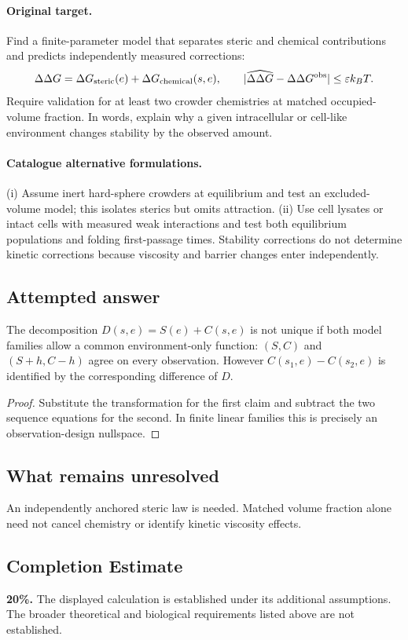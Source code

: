 \documentclass[11pt]{article}
\begin{document}
\paragraph{Original target.}
Find a finite-parameter model that separates steric and chemical contributions and predicts independently measured corrections:
\[
\Delta\Delta G=\Delta G_{\rm steric}(e)+\Delta G_{\rm chemical}(s,e),\qquad
|\widehat{\Delta\Delta G}-\Delta\Delta G^{\rm obs}|\leq\varepsilon k_BT.
\]
Require validation for at least two crowder chemistries at matched occupied-volume fraction. In words, explain why a given intracellular or cell-like environment changes stability by the observed amount.
\paragraph{Catalogue alternative formulations.}
(i) Assume inert hard-sphere crowders at equilibrium and test an excluded-volume model; this isolates sterics but omits attraction. (ii) Use cell lysates or intact cells with measured weak interactions and test both equilibrium populations and folding first-passage times. Stability corrections do not determine kinetic corrections because viscosity and barrier changes enter independently.
\subsection{Attempted answer}
\begin{proposition}
The decomposition $D(s,e)=S(e)+C(s,e)$ is not unique if both model families allow a common environment-only function: $(S,C)$ and $(S+h,C-h)$ agree on every observation. However $C(s_1,e)-C(s_2,e)$ is identified by the corresponding difference of $D$.
\end{proposition}
\begin{proof}
Substitute the transformation for the first claim and subtract the two sequence equations for the second. In finite linear families this is precisely an observation-design nullspace.
\end{proof}
\subsection{What remains unresolved}
An independently anchored steric law is needed. Matched volume fraction alone need not cancel chemistry or identify kinetic viscosity effects.
\subsection{Completion Estimate}
\textbf{20\%.} The displayed calculation is established under its additional assumptions. The broader theoretical and biological requirements listed above are not established.
\end{document}
